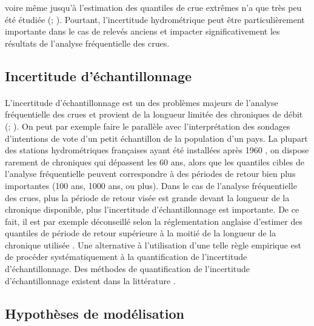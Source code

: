 voire même jusqu'à l'estimation des quantiles de crue extrêmes n'a que très peu été étudiée (\cite{horner_impact_2018}; \cite{steinbakk_propagation_2016}). Pourtant, l'incertitude hydrométrique peut être particulièrement importante dans le cas de relevés anciens et impacter significativement les résultats de l'analyse fréquentielle des crues.
	
	\subsection*{Incertitude d'échantillonnage}
	
	\paragraph{} L'incertitude d'échantillonnage est un des problèmes majeurs de l'analyse fréquentielle des crues et provient de la longueur limitée des chroniques de débit (\cite{apel_flood_2004}; \cite{kjeldsen_uncertainty_2011}). On peut par exemple faire le parallèle avec l'interprétation des sondages d'intentions de vote d'un petit échantillon de la population d'un pays. La plupart des stations hydrométriques françaises ayant été installées après 1960 \citep{le_coz_quantifying_2017}, on dispose rarement de chroniques qui dépassent les 60 ans, alors que les quantiles cibles de l'analyse fréquentielle peuvent correspondre à des périodes de retour bien plus importantes (100 ans, 1000 ans, ou plus). Dans le cas de l'analyse fréquentielle des crues, plus la période de retour visée est grande devant la longueur de la chronique disponible, plus l'incertitude d'échantillonnage est importante. De ce fait, il est par exemple déconseillé selon la réglementation anglaise d'estimer des quantiles de période de retour supérieure à la moitié de la longueur de la chronique utilisée \citep{whs_flood_2008}.	Une alternative à l'utilisation d'une telle règle empirique est de procéder systématiquement à la quantification de l'incertitude d'échantillonnage. Des méthodes de quantification de l'incertitude d'échantillonnage existent dans la littérature \citep{coles_classical_2001}.
	
	\subsection*{Hypothèses de modélisation}
	
